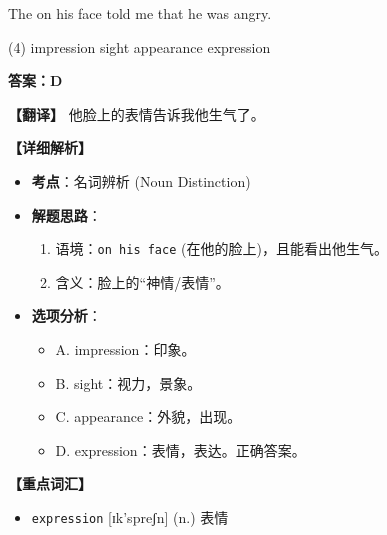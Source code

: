 \documentclass[11pt, a4paper]{article}
\newcommand{\analysis}[4]{
    \begin{solutionbox}
        \textbf{答案：#1}
        
        \textbf{【翻译】} #2
        
        \textbf{【详细解析】}
        #3
        
        \textbf{【重点词汇】}
        #4
    \end{solutionbox}
}
\newcommand{\blank}{\underline{\hspace{1.5cm}}}
\begin{document}
\begin{questions}
    \item The \blank on his face told me that he was angry.
    \begin{tasks}(4)
        \task impression \task sight \task appearance \task expression
    \end{tasks}
    \analysis{D}{他脸上的表情告诉我他生气了。}{
        \begin{itemize}
            \item \textbf{考点}：名词辨析 (Noun Distinction)
            \item \textbf{解题思路}：
                \begin{enumerate}
                    \item 语境：\texttt{on his face} (在他的脸上)，且能看出他生气。
                    \item 含义：脸上的“神情/表情”。
                \end{enumerate}
            \item \textbf{选项分析}：
                \begin{itemize}
                    \item A. impression：印象。
                    \item B. sight：视力，景象。
                    \item C. appearance：外貌，出现。
                    \item D. expression：表情，表达。正确答案。
                \end{itemize}
        \end{itemize}
    }{
        \begin{itemize}
            \item \texttt{expression} [ɪk'spreʃn] (n.) 表情
        \end{itemize}
    }


\end{questions}
\end{document}
